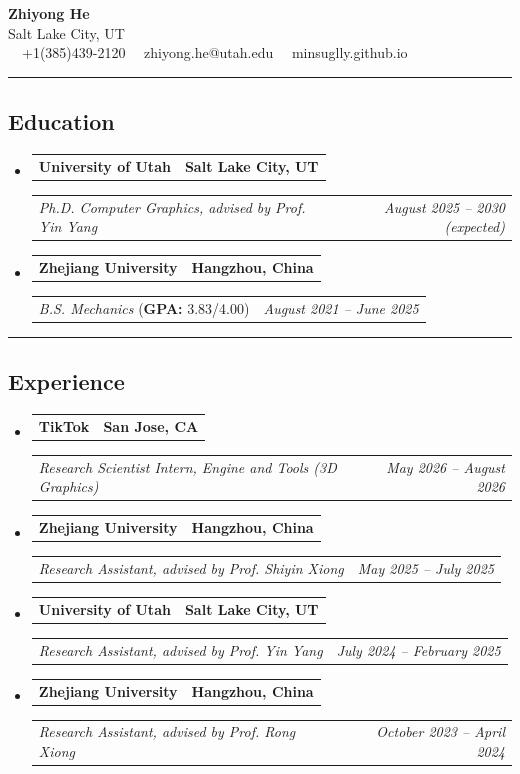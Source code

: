 \documentclass[11pt,letterpaper]{article}
\makeatletter
\newcommand{\headerrow}[2]
{\begin{tabular*}{\linewidth}{l@{\extracolsep{\fill}}r}
#1 &
#2 \\
\end{tabular*}}
\makeatother
\begin{document}
\begin{center}
	{\LARGE \textbf{Zhiyong He}}\\
	Salt Lake City, UT
	\vspace{0.05cm}
	\\
	\raisebox{-0.2\height} {\Large \faPhoneSquare} \ \  +1(385)439-2120 \hfill\raisebox{-0.2\height}{\Large \faEnvelopeSquare} \ \ zhiyong.he@utah.edu \hfill \raisebox{-0.2\height}{\Large \faGithubSquare} \ \ minsuglly.github.io \hfill
\end{center}

\hrule
\vspace{-1em}
\subsection*{\Large Education}

\begin{itemize}[leftmargin=1em]
	\parskip=0.1em
	\item
	      \headerrow
	      {\textbf{University of Utah}}
	      {\textbf{Salt Lake City, UT}}
	      \headerrow
	      {\emph{Ph.D. Computer Graphics, advised by Prof. Yin Yang}}
	      {\emph{August 2025 -- 2030 (expected)}}
	\item
	      \headerrow
	      {\textbf{Zhejiang University}}
	      {\textbf{Hangzhou, China}}
	      \headerrow
	      {\emph{B.S. Mechanics} (\textbf{GPA:} 3.83/4.00)}
	      {\emph{August 2021 -- June 2025}}
\end{itemize}

\hrule
\vspace{-1em}
\subsection*{\Large Experience}

\begin{itemize}[leftmargin=1em]
	\parskip=0.3em

	\item
	      \headerrow
	      {\textbf{TikTok}}
	      {\textbf{San Jose, CA}}
	      \headerrow
	      {\emph{Research Scientist Intern, Engine and Tools (3D Graphics)}}
	      {\emph{May 2026 -- August 2026}}

	\item
	      \headerrow
	      {\textbf{Zhejiang University}}
	      {\textbf{Hangzhou, China}}
	      \headerrow
	      {\emph{Research Assistant, advised by Prof. Shiyin Xiong}}
	      {\emph{May 2025 -- July 2025}}

	\item
	      \headerrow
	      {\textbf{University of Utah}}
	      {\textbf{Salt Lake City, UT}}
	      \headerrow
	      {\emph{Research Assistant, advised by Prof. Yin Yang}}
	      {\emph{July 2024 -- February 2025}}

	\item
	      \headerrow
	      {\textbf{Zhejiang University}}
	      {\textbf{Hangzhou, China}}
	      \headerrow
	      {\emph{Research Assistant, advised by Prof. Rong Xiong}}
	      {\emph{October 2023 -- April 2024}}
\end{itemize}
\end{document}
